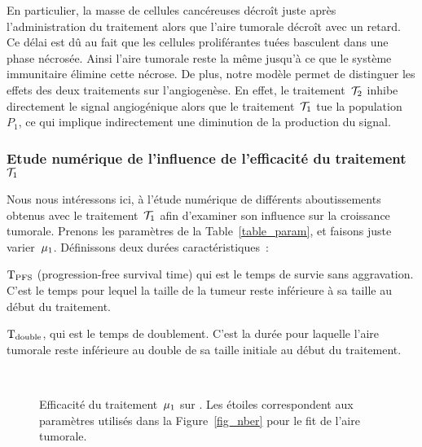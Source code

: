 \documentclass[main.tex]{subfiles}
\begin{document}
En particulier, la masse de cellules cancéreuses décroît juste après l'administration du traitement alors que l'aire tumorale décroît avec un retard. 
Ce délai est dû au fait que les cellules proliférantes tuées basculent dans une phase nécrosée. Ainsi l'aire tumorale reste la même jusqu'à ce que le système immunitaire élimine cette nécrose. 
De plus, notre modèle permet de distinguer les effets des deux traitements sur l'angiogenèse. 
En effet, le traitement~${\mathcal T_2}$ inhibe directement le signal angiogénique alors que le  traitement~${\mathcal T_1}$ tue la population~$P_1$, ce qui implique indirectement une diminution de la production du signal.


\subsubsection{Etude numérique de l'influence de l'efficacité du traitement~${\mathcal T_1}$}\label{subsec:NumEff}
Nous nous intéressons ici, à l'étude numérique de différents aboutissements obtenus avec le 
traitement~${\mathcal T_1}$ afin d'examiner son influence sur la croissance tumorale. 
Prenons les paramètres de la Table~\ref{table_param}, et faisons juste varier~$\mu_1$. 
Définissons deux durées caractéristiques~:
\begin{myitemize}
\item ${\rm T_{PFS}}$ (progression-free survival time) qui est le temps de survie sans aggravation. C'est le temps pour lequel la taille de la tumeur reste inférieure à sa taille au début du traitement.  
\item ${\rm T_{double}}$, qui est le temps de doublement. C'est la durée pour laquelle l'aire tumorale reste inférieure au double de sa taille initiale au début du traitement. 
\end{myitemize}
\begin{figure}[!htb]
\centering
\captionsetup[subfigure]{margin=10pt}
\\
\caption{Efficacité du traitement~$\mu_1$ sur \Nber. Les étoiles correspondent aux paramètres utilisés dans la Figure~\ref{fig_nber} pour le fit de l'aire tumorale. \label{fig:eff_glivec_nber}}
\end{figure}
\end{document}
